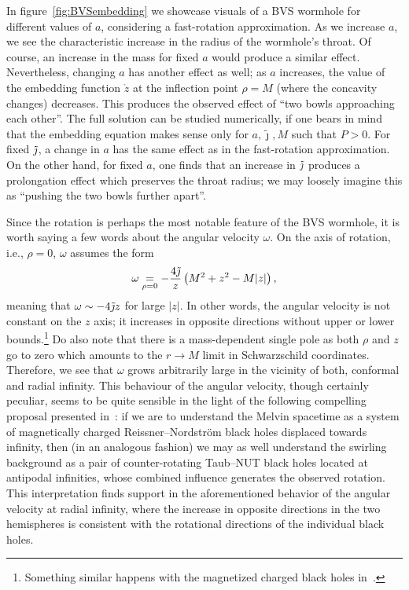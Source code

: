 \documentclass[aps,preprint,groupedaddress,nofootinbib,superscriptaddress,showkeys,showpacs,eqsecnum,amsmath,amssymb]{revtex4-1}
\begin{document}
In figure~\ref{fig:BVSembedding} we showcase visuals of a BVS wormhole for different values of $a$, considering a fast-rotation approximation. As we increase $a$, we see the characteristic increase in the radius of the wormhole's throat. Of course, an increase in the mass for fixed $a$ would produce a similar effect. Nevertheless, changing $a$ has another effect as well; as $a$ increases, the value of the embedding function $\mathring{z}$ at the inflection point $\rho=M$ (where the concavity changes) decreases. This produces the observed effect of ``two bowls approaching each other''. The full solution can be studied numerically, if one bears in mind that the embedding equation makes sense only for $a,\tilde{\jmath},M$ such that $P>0$. For fixed $\Tilde{\jmath}$, a change in $a$ has the same effect as in the fast-rotation approximation. On the other hand, for fixed $a$, one finds that an increase in $\Tilde{\jmath}$ produces a prolongation effect which preserves the throat radius; we may loosely imagine this as ``pushing the two bowls further apart''.   

Since the rotation is perhaps the most notable feature of the BVS wormhole, it is worth saying a few words about the angular velocity $\omega$. On the axis of rotation, i.e., $\rho=0$, $\omega$ assumes the form
\begin{equation}
    \omega \underset{\rho=0}{=}-\frac{4\Tilde{\jmath}}{z}\left( M^2 + z^2 - M|z|\right),
\end{equation}
meaning that $\omega\sim -4\Tilde{\jmath}z$ for large $|z|$. In other words, the angular velocity is not constant on the $z$ axis; it increases in opposite directions without upper or lower bounds.\footnote{Something similar happens with the magnetized charged black holes in~\cite{Gibbons:2013yq}.} Do also note that there is a mass-dependent single pole as both $\rho$ and $z$ go to zero which amounts to the $r\to M$ limit in Schwarzschild coordinates. Therefore, we see that $\omega$ grows arbitrarily large in the vicinity of both, conformal and radial infinity. This behaviour of the angular velocity, though certainly peculiar, seems to be quite sensible in the light of the following compelling proposal presented in~\cite{Astorino:2022aam}: if we are to understand the Melvin spacetime as a system of magnetically charged Reissner–Nordström black holes displaced towards infinity, then (in an analogous fashion) we may as well understand the swirling background as a pair of counter-rotating Taub–NUT black holes located at antipodal infinities, whose combined influence generates the observed rotation. This interpretation finds support in the aforementioned behavior of the angular velocity at radial infinity, where the increase in opposite directions in the two hemispheres is consistent with the rotational directions of the individual black holes. 
\end{document}
